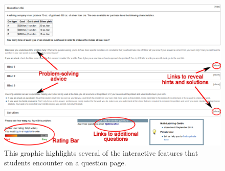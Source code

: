 \documentclass{primus}
\begin{document}
\begin{figure}[H]
\centering
\includegraphics[width=\textwidth]{figs/Question_Page_annotated.png}
\caption{This graphic highlights several of the interactive features that students encounter on a question page.}\label{fig:question_page_annotate}
\end{figure}
\end{document}
